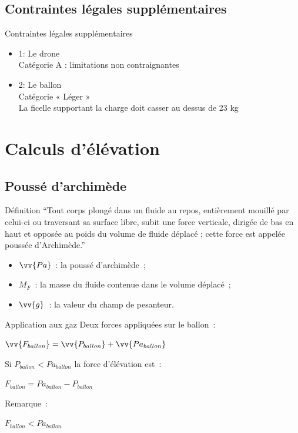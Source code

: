 \documentclass{beamer}
\begin{document}
\subsection{Contraintes légales supplémentaires}
\begin{frame}{Contraintes légales supplémentaires}
  \begin{itemize}
    \item 1: Le drone \\
	    Catégorie A : limitations non contraignantes
    \item 2: Le ballon \\
	    Catégorie « Léger » \\
	    La ficelle supportant la charge doit casser au dessus de 23 kg
 \end{itemize}
\end{frame}

\section{Calculs d'élévation}

\subsection{Poussé d'archimède}

\begin{frame}{Définition}
  \enquote{Tout corps plongé dans un fluide au repos, entièrement mouillé par celui-ci ou traversant sa surface libre, subit une force verticale, dirigée de bas en haut et opposée au poids du volume de fluide déplacé ; cette force est appelée poussée d'Archimède.}
  \bigbreak
  \begin{center}
  \end{center}
  \begin{itemize}
    \item $\vv{Pa}$~: la poussé d'archimède~;
    \item $M_F$~: la masse du fluide contenue dans le volume déplacé~;
    \item $\vv{g}$~: la valeur du champ de pesanteur.
  \end{itemize}
\end{frame}

\begin{frame}{Application aux gaz}
  Deux forces appliquées sur le ballon~: \\
  \begin{center}
    $\displaystyle{\vv{F_{ballon}} = \vv{P_{ballon}} + \vv{Pa_{ballon}}}$ \\
  \end{center}
  Si $P_{ballon} < Pa_{ballon}$ la force d'élévation est~:
  \begin{center}
    $\displaystyle{F_{ballon} = Pa_{ballon} - P_{ballon}}$ \\
  \end{center}
  Remarque~:\\
  \begin{center}
    $F_{ballon} < Pa_{ballon}$
  \end{center}
\end{frame}
\end{document}
